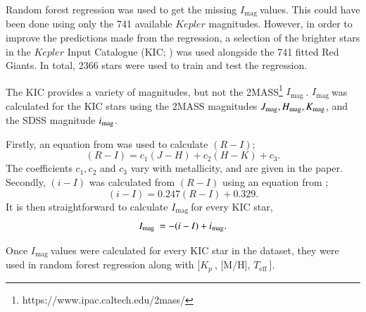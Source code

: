 \documentclass[a4paper,fleqn,usenatbib,useAMS]{mnras}
\newcommand{\teff}{\ensuremath{T_{\textrm{eff}}\:}}
\newcommand{\kp}{\ensuremath{K_{p}\:}}
\newcommand{\imag}{\ensuremath{I_{\textrm{mag}}\:}}
\begin{document}
Random forest regression was used to get the missing \imag values. This could have been done using only the 741 available $Kepler$ magnitudes. However, in order to improve the predictions made from the regression, a selection of the brighter stars in the $Kepler$ Input Catalogue (KIC; \citet{brown_kepler_2011}) was used alongside the 741 fitted Red Giants. In total, 2366 stars were used to train and test the regression.

The KIC provides a variety of magnitudes, but not the 2MASS\footnote{https://www.ipac.caltech.edu/2mass/} \imag. \imag was calculated for the KIC stars using the 2MASS magnitudes $J_{\rm mag}, H_{\rm mag}, K_{\rm mag}$, and the SDSS \citep{kollmeier_sdss-v:_2017} magnitude $i_{\rm mag}$.

Firstly, an equation from \citet{bilir_transformations_2008} was used to calculate $(R-I)$;
\begin{equation}
(R-I) = c_{1}(J-H) +c_{2}(H-K) + c_{3} .
\end{equation}
The coefficients $c_{1}, c_{2}$ and $c_{3}$ vary with metallicity, and are given in the paper. Secondly, $(i-I)$ was calculated from $(R-I)$ using an equation from \citet{jordi_empirical_2006};
\begin{equation}
\label{eq: i-I}
(i-I) = 0.247(R-I) + 0.329 .
\end{equation}
It is then straightforward to calculate \imag for every KIC star,
\begin{equation}
\imag = -(i-I) + i_{\rm mag} .
\end{equation}

Once \imag values were calculated for every KIC star in the dataset, they were used in random forest regression along with [\kp, [M/H], \teff].
\end{document}
